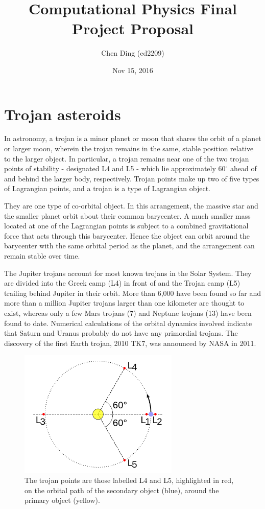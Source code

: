 \documentclass[12pt,a4paper]{article}
\begin{document}
\title{Computational Physics Final Project Proposal}
\author{Chen Ding (cd2209)}
\date{Nov 15, 2016}
\maketitle


\section{Trojan asteroids}

In astronomy, a trojan is a minor planet or moon that shares the orbit of a planet or larger moon, wherein the trojan remains in the same, stable position relative to the larger object. In particular, a trojan remains near one of the two trojan points of stability - designated L4 and L5 - which lie approximately 60$^{\circ}$ ahead of and behind the larger body, respectively. Trojan points make up two of five types of Lagrangian points, and a trojan is a type of Lagrangian object.

They are one type of co-orbital object. In this arrangement, the massive star and the smaller planet orbit about their common barycenter. A much smaller mass located at one of the Lagrangian points is subject to a combined gravitational force that acts through this barycenter. Hence the object can orbit around the barycenter with the same orbital period as the planet, and the arrangement can remain stable over time.

The Jupiter trojans account for most known trojans in the Solar System. They are divided into the Greek camp (L4) in front of and the Trojan camp (L5) trailing behind Jupiter in their orbit. More than 6,000 have been found so far and more than a million Jupiter trojans larger than one kilometer are thought to exist, whereas only a few Mars trojans (7) and Neptune trojans (13) have been found to date. Numerical calculations of the orbital dynamics involved indicate that Saturn and Uranus probably do not have any primordial trojans. The discovery of the first Earth trojan, 2010 TK7, was announced by NASA in 2011.


\begin{figure}[H]
\centering
\includegraphics[width=3in]{500px-Lagrange_very_massive.png}
\caption{The trojan points are those labelled L4 and L5, highlighted in red, on the orbital path of the secondary object (blue), around the primary object (yellow).}
\end{figure}
\end{document}
